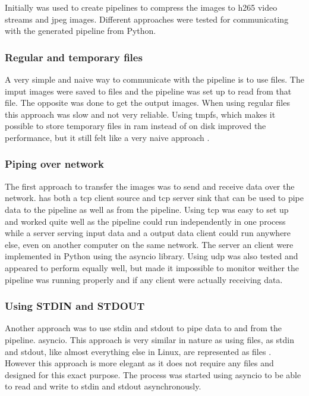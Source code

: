 Initially  was used to create pipelines to compress the images to \gls{h265} video streams and \gls{jpeg} images.
Different approaches were tested for communicating with the generated pipeline from Python.

\subsubsection{Regular and temporary files}
A very simple and naive way to communicate with the pipeline is to use files.
The imput images were saved to files and the pipeline was set up to read from that file.
The opposite was done to get the output images.
When using regular files this approach was slow and not very reliable.
Using \gls{tmpfs}, which makes it possible to store temporary files in \gls{ram} instead of on disk improved the performance, but it still felt like a very naive approach \cite{dickinsTmpfsLinuxKernel2010}.

\subsubsection{Piping over network}
The first approach to transfer the images was to send and receive data over the network.
\gs has both a \gls{tcp} client source and \gls{tcp} server sink that can be used to pipe data to the pipeline as well as from the pipeline.
Using \gls{tcp} was easy to set up and worked quite well as the pipeline could run independently in one process while a server serving input data and a output data client could run anywhere else, even on another computer on the same network.
The server an client were implemented in Python using the \gls{asyncio} library.
Using \gls{udp} was also tested and appeared to perform equally well, but made it impossible to monitor weither the pipeline was running properly and if any client were actually receiving data.


\subsubsection{Using STDIN and STDOUT}
Another approach was to use \gls{stdin} and \gls{stdout} to pipe data to and from the pipeline.
\gls{asyncio}.
This approach is very similar in nature as using files, as \gls{stdin} and \gls{stdout}, like almost everything else in Linux, are represented as files \cite{mckayWhatAreStdin2020}.
However this approach is more elegant as it does not require any files and designed for this exact purpose.
The \gs process was started using \gls{asyncio} to be able to read and write to \gls{stdin} and \gls{stdout} asynchronously.

